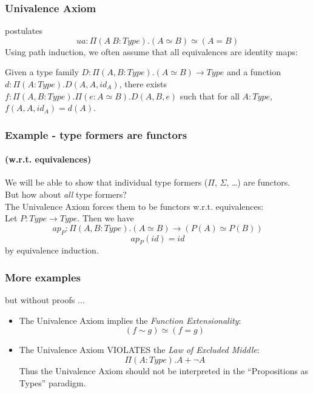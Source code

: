 \documentclass[dvipdfmx]{beamer}
\begin{document}
\begin{frame}
  \frametitle{Univalence Axiom}
  postulates
  \[
    ua : \Pi \left( A \ B : Type \right) .
    \left( A \simeq B \right) \simeq \left( A = B \right)
  \]
  \pause
  Using path induction,
  we often assume that all equivalences are identity maps:

  \begin{theorem}
    Given a type family
    $D : \Pi \left( A , B : Type \right) . \left( A \simeq B \right)
    \to Type$ and a function
    $d : \Pi \left( A : Type \right) . D \left( A , A , id_A \right)$,
    there exists
    $f : \Pi \left( A , B : Type \right) .
    \Pi \left( e : A \simeq B \right) .
    D \left( A , B , e \right)$ such that
    for all $A : Type$,
    $f \left( A , A , id_A \right) = d \left( A \right)$.
  \end{theorem}
\end{frame}

\begin{frame}
  \frametitle{Example - type formers are functors}
  \framesubtitle{(w.r.t. equivalences)}
  We will be able to show that
  individual type formers ($\Pi$, $\Sigma$, \dots) are functors.
  \pause
  \\
  But how about {\it all} type formers?
  \pause
  \\
  The Univalence Axiom forces them to be functors w.r.t. equivalences:
  \\
  Let $P : Type \to Type$.
  Then we have
  \[
    ap_P : \Pi \left( A , B : Type \right) .
    \left( A \simeq B \right) \to
    \left( P \left( A \right) \simeq P \left( B \right) \right)
  \]
  \[
    ap_P \left( id \right) = id
  \]
  by equivalence induction.
\end{frame}

\begin{frame}
  \frametitle{More examples}
  but without proofs $\dots$
  \begin{itemize}
      \pause
    \item The Univalence Axiom implies the
      {\it Function Extensionality}:
      \[
        \left( f \sim g \right) \simeq \left( f = g \right)
      \]
      \pause
    \item The Univalence Axiom VIOLATES
      the {\it Law of Excluded Middle}:
      \[
        \Pi \left( A : Type \right) .
        A + \neg A
      \]
      Thus the Univalence Axiom should not be
      interpreted in the
      ``Propositions as Types'' paradigm.
  \end{itemize}
\end{frame}
\end{document}
